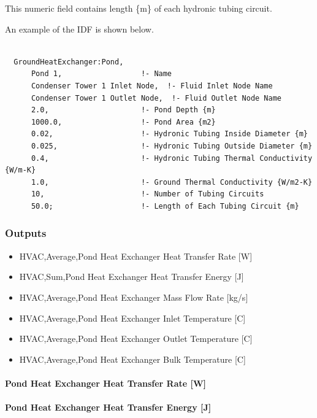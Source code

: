 This numeric field contains length \{m\} of each hydronic tubing circuit.

An example of the IDF is shown below.

\begin{lstlisting}

  GroundHeatExchanger:Pond,
      Pond 1,                  !- Name
      Condenser Tower 1 Inlet Node,  !- Fluid Inlet Node Name
      Condenser Tower 1 Outlet Node,  !- Fluid Outlet Node Name
      2.0,                     !- Pond Depth {m}
      1000.0,                  !- Pond Area {m2}
      0.02,                    !- Hydronic Tubing Inside Diameter {m}
      0.025,                   !- Hydronic Tubing Outside Diameter {m}
      0.4,                     !- Hydronic Tubing Thermal Conductivity {W/m-K}
      1.0,                     !- Ground Thermal Conductivity {W/m2-K}
      10,                      !- Number of Tubing Circuits
      50.0;                    !- Length of Each Tubing Circuit {m}
\end{lstlisting}

\subsubsection{Outputs}\label{outputs-12-000}

\begin{itemize}
\item
  HVAC,Average,Pond Heat Exchanger Heat Transfer Rate {[}W{]}
\item
  HVAC,Sum,Pond Heat Exchanger Heat Transfer Energy {[}J{]}
\item
  HVAC,Average,Pond Heat Exchanger Mass Flow Rate {[}kg/s{]}
\item
  HVAC,Average,Pond Heat Exchanger Inlet Temperature {[}C{]}
\item
  HVAC,Average,Pond Heat Exchanger Outlet Temperature {[}C{]}
\item
  HVAC,Average,Pond Heat Exchanger Bulk Temperature {[}C{]}
\end{itemize}

\paragraph{Pond Heat Exchanger Heat Transfer Rate {[}W{]}}\label{pond-heat-exchanger-heat-transfer-rate-w}

\paragraph{Pond Heat Exchanger Heat Transfer Energy {[}J{]}}\label{pond-heat-exchanger-heat-transfer-energy-j}

